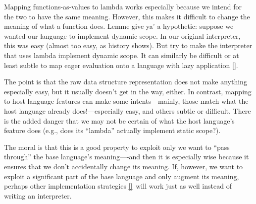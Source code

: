 
Mapping functions-as-values to lambda works especially because we intend for the
two to have the same meaning. However, this makes it difficult to change the
meaning of what a function does. Lemme give ya’ a hypothetic: suppose we wanted
our language to implement dynamic scope. In our original interpreter, this was
easy (almost too easy, as history shows). But try to make the interpreter that
uses lambda implement dynamic scope. It can similarly be difficult or at least
subtle to map eager evaluation onto a language with lazy application \ref{}.


The point is that the raw data structure representation does not make anything
especially easy, but it usually doesn’t get in the way, either. In contrast,
mapping to host language features can make some intents—mainly, those match what
the host language already does!—especially easy, and others subtle or difficult.
There is the added danger that we may not be certain of what the host language’s
feature does (e.g., does its “lambda” actually implement static scope?).

The moral is that this is a good property to exploit only we want to “pass
through” the base language’s meaning—-and then it is especially wise because it
ensures that we don’t accidentally change its meaning. If, however, we want to
exploit a significant part of the base language and only augment its meaning,
perhaps other implementation strategies \ref{}\ will work just as well instead
of writing an interpreter.
